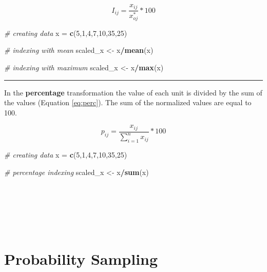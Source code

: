 \documentclass[
]{svmono}
\newenvironment{Shaded}{\begin{snugshade}}{\end{snugshade}}
\newcommand{\CommentTok}[1]{\textcolor[rgb]{0.56,0.35,0.01}{\textit{#1}}}
\newcommand{\DecValTok}[1]{\textcolor[rgb]{0.00,0.00,0.81}{#1}}
\newcommand{\FunctionTok}[1]{\textcolor[rgb]{0.13,0.29,0.53}{\textbf{#1}}}
\newcommand{\NormalTok}[1]{#1}
\newcommand{\OtherTok}[1]{\textcolor[rgb]{0.56,0.35,0.01}{#1}}
\newcommand{\SpecialCharTok}[1]{\textcolor[rgb]{0.81,0.36,0.00}{\textbf{#1}}}
\begin{document}
\begin{equation}
I_{ij}=\frac{x_{ij}}{x^*_{oj}}*100
\label{eq:in}
\end{equation}

\begin{Shaded}
\begin{Highlighting}[]
\CommentTok{\# creating data}
\NormalTok{x }\OtherTok{=} \FunctionTok{c}\NormalTok{(}\DecValTok{5}\NormalTok{,}\DecValTok{1}\NormalTok{,}\DecValTok{4}\NormalTok{,}\DecValTok{7}\NormalTok{,}\DecValTok{10}\NormalTok{,}\DecValTok{35}\NormalTok{,}\DecValTok{25}\NormalTok{)}

\CommentTok{\# indexing with mean}
\NormalTok{scaled\_x }\OtherTok{\textless{}{-}}\NormalTok{ x}\SpecialCharTok{/}\FunctionTok{mean}\NormalTok{(x)}

\CommentTok{\# indexing with maximum}
\NormalTok{scaled\_x }\OtherTok{\textless{}{-}}\NormalTok{ x}\SpecialCharTok{/}\FunctionTok{max}\NormalTok{(x)}
\end{Highlighting}
\end{Shaded}

\begin{center}\rule{0.5\linewidth}{0.5pt}\end{center}

In the \textbf{percentage} transformation the value of each unit is divided
by the sum of the values (Equation \eqref{eq:perc}). The sum of the normalized
values are equal to 100.

\begin{equation}
p_{ij}=\frac{x_{ij}}{\sum^n_{i=1}x_{ij}}*100
\label{eq:perc}
\end{equation}

\begin{Shaded}
\begin{Highlighting}[]
\CommentTok{\# creating data}
\NormalTok{x }\OtherTok{=} \FunctionTok{c}\NormalTok{(}\DecValTok{5}\NormalTok{,}\DecValTok{1}\NormalTok{,}\DecValTok{4}\NormalTok{,}\DecValTok{7}\NormalTok{,}\DecValTok{10}\NormalTok{,}\DecValTok{35}\NormalTok{,}\DecValTok{25}\NormalTok{)}

\CommentTok{\# percentage indexing}
\NormalTok{scaled\_x }\OtherTok{\textless{}{-}}\NormalTok{ x}\SpecialCharTok{/}\FunctionTok{sum}\NormalTok{(x)}
\end{Highlighting}
\end{Shaded}

~

~

~

\hypertarget{probability-sampling}{%
\section{Probability Sampling}\label{probability-sampling}}
\end{document}

